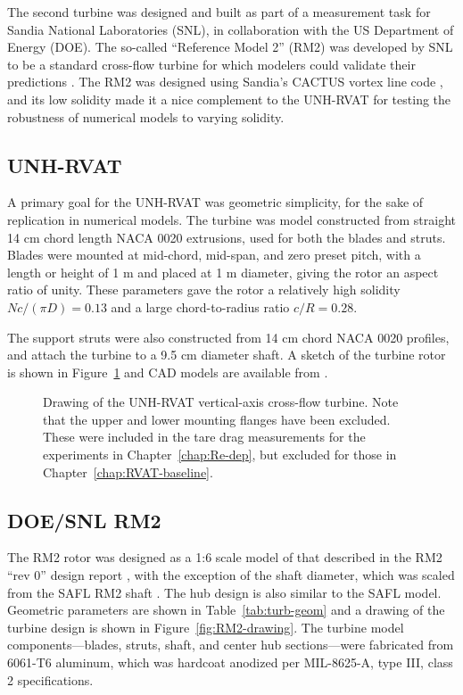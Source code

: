 The second turbine was designed and built as part of a measurement task for
Sandia National Laboratories (SNL), in collaboration with the US Department of
Energy (DOE). The so-called ``Reference Model 2'' (RM2) was developed by SNL to
be a standard cross-flow turbine for which modelers could validate their
predictions \cite{Neary2014}. The RM2 was designed using Sandia's CACTUS vortex
line code \cite{Barone2011}, and its low solidity made it a nice complement to
the UNH-RVAT for testing the robustness of numerical models to varying solidity.


\subsection{UNH-RVAT}

A primary goal for the UNH-RVAT was geometric simplicity, for the sake of
replication in numerical models. The turbine was model constructed from straight
14 cm chord length NACA 0020 extrusions, used for both the blades and struts.
Blades were mounted at mid-chord, mid-span, and zero preset pitch, with a length
or height of 1 m and placed at 1 m diameter, giving the rotor an aspect ratio of
unity. These parameters gave the rotor a relatively high solidity $Nc/(\pi D) =
0.13$ and a large chord-to-radius ratio $c/R = 0.28$. 

The support struts were also constructed from 14 cm chord NACA 0020 profiles,
and attach the turbine to a 9.5 cm diameter shaft. A sketch of the turbine rotor
is shown in Figure~\ref{fig:unh-rvat} and CAD models are available from
\cite{Bachant2014-RVAT-CAD}.

\begin{figure}[ht]
    \caption{Drawing of the UNH-RVAT vertical-axis cross-flow turbine. Note that
        the upper and lower mounting flanges have been excluded. These were included
        in the tare drag measurements for the experiments in
        Chapter~\ref{chap:Re-dep}, but excluded for those in
        Chapter~\ref{chap:RVAT-baseline}.}
    
    \label{fig:unh-rvat}
\end{figure}


\subsection{DOE/SNL RM2}

The RM2 rotor was designed as a 1:6 scale model of that described in the RM2
``rev 0'' design report \cite{Barone2011}, with the exception of the shaft
diameter, which was scaled from the SAFL RM2 shaft \cite{Hill2014}. The hub
design is also similar to the SAFL model. Geometric parameters are shown in
Table~\ref{tab:turb-geom} and a drawing of the turbine design is shown in
Figure~\ref{fig:RM2-drawing}. The turbine model components---blades, struts,
shaft, and center hub sections---were fabricated from 6061-T6 aluminum, which
was hardcoat anodized per MIL-8625-A, type III, class 2 specifications.

